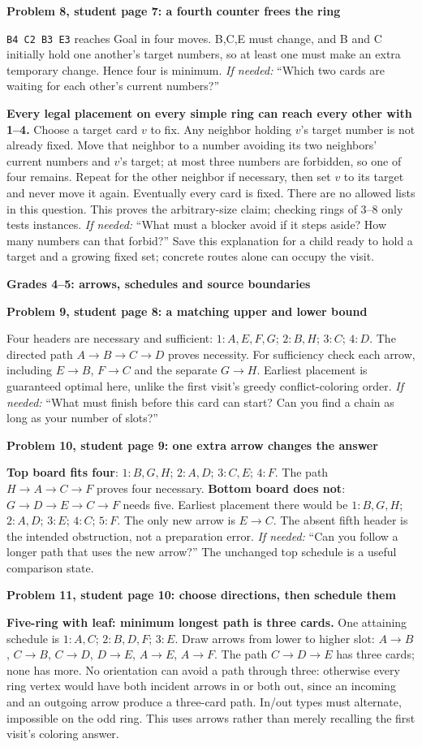 \documentclass[10pt]{article}
\newcommand{\head}[1]{\par{\large\bfseries #1}\par}
\newcommand{\sub}[1]{\par\textbf{#1}\par}
\newcommand{\hint}[1]{\textit{If needed:} #1}
\newcommand{\word}[1]{\texttt{#1}}
\begin{document}
\sub{Problem 8, student page 7: a fourth counter frees the ring}
\word{B4 C2 B3 E3} reaches Goal in four moves. B,C,E must change, and B and C initially hold one another's target numbers, so at least one must make an extra temporary change. Hence four is minimum. \hint{``Which two cards are waiting for each other's current numbers?''}

\textbf{Every legal placement on every simple ring can reach every other with 1--4.} Choose a target card $v$ to fix. Any neighbor holding $v$'s target number is not already fixed. Move that neighbor to a number avoiding its two neighbors' current numbers and $v$'s target; at most three numbers are forbidden, so one of four remains. Repeat for the other neighbor if necessary, then set $v$ to its target and never move it again. Eventually every card is fixed. There are no allowed lists in this question. This proves the arbitrary-size claim; checking rings of 3--8 only tests instances. \hint{``What must a blocker avoid if it steps aside? How many numbers can that forbid?''} Save this explanation for a child ready to hold a target and a growing fixed set; concrete routes alone can occupy the visit.
\newpage
\head{Grades 4--5: arrows, schedules and source boundaries}
\sub{Problem 9, student page 8: a matching upper and lower bound}
Four headers are necessary and sufficient: $1:A,E,F,G$; $2:B,H$; $3:C$; $4:D$. The directed path $A\to B\to C\to D$ proves necessity. For sufficiency check each arrow, including $E\to B$, $F\to C$ and the separate $G\to H$. Earliest placement is guaranteed optimal here, unlike the first visit's greedy conflict-coloring order. \hint{``What must finish before this card can start? Can you find a chain as long as your number of slots?''}

\sub{Problem 10, student page 9: one extra arrow changes the answer}
\textbf{Top board fits four}: $1:B,G,H$; $2:A,D$; $3:C,E$; $4:F$. The path $H\to A\to C\to F$ proves four necessary. \textbf{Bottom board does not}: $G\to D\to E\to C\to F$ needs five. Earliest placement there would be $1:B,G,H$; $2:A,D$; $3:E$; $4:C$; $5:F$. The only new arrow is $E\to C$. The absent fifth header is the intended obstruction, not a preparation error. \hint{``Can you follow a longer path that uses the new arrow?''} The unchanged top schedule is a useful comparison state.

\sub{Problem 11, student page 10: choose directions, then schedule them}
\textbf{Five-ring with leaf: minimum longest path is three cards.} One attaining schedule is $1:A,C$; $2:B,D,F$; $3:E$. Draw arrows from lower to higher slot: $A\to B$, $C\to B$, $C\to D$, $D\to E$, $A\to E$, $A\to F$. The path $C\to D\to E$ has three cards; none has more. No orientation can avoid a path through three: otherwise every ring vertex would have both incident arrows in or both out, since an incoming and an outgoing arrow produce a three-card path. In/out types must alternate, impossible on the odd ring. This uses arrows rather than merely recalling the first visit's coloring answer.
\end{document}
